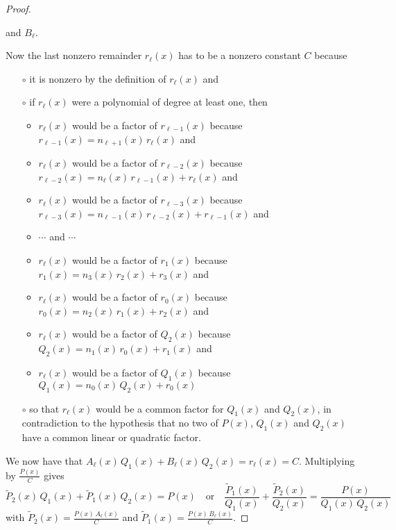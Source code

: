 \begin{proof}
\begin{itemize}
and $B_\ell$. 
\end{itemize}
Now the last nonzero remainder $r_\ell(x)$ has to be a nonzero constant $C$
because
\begin{itemize}\itemsep1pt \parskip0pt  %
\item[$\circ$]
it is nonzero by the definition of $r_\ell(x)$ and
\item[$\circ$]
if $r_\ell(x)$ were a polynomial of degree at least one, then
\begin{itemize}\itemsep1pt \parskip0pt  \itemindent-15pt
\item $r_\ell(x)$ would be a factor of $r_{\ell-1}(x)$ because 
          $r_{\ell-1}(x)=n_{\ell+1}(x)\,r_\ell(x)$ and
\item $r_\ell(x)$ would be a factor of $r_{\ell-2}(x)$ because 
          $r_{\ell-2}(x)=n_\ell(x)\,r_{\ell-1}(x)+r_\ell(x)$ and
\item $r_\ell(x)$ would be a factor of $r_{\ell-3}(x)$ because 
          $r_{\ell-3}(x)=n_{\ell-1}(x)\,r_{\ell-2}(x)+r_{\ell-1}(x)$ and
\item $\cdots$ and $\cdots$
\item $r_\ell(x)$ would be a factor of $r_1(x)$ because 
          $r_1(x)=n_3(x)\,r_2(x)+r_3(x)$ and
\item $r_\ell(x)$ would be a factor of $r_0(x)$ because 
          $r_0(x)=n_2(x)\,r_1(x)+r_2(x)$ and
\item $r_\ell(x)$ would be a factor of $Q_2(x)$ because 
          $Q_2(x)=n_1(x)\,r_0(x)+r_1(x)$ and
\item $r_\ell(x)$ would be a factor of $Q_1(x)$ because 
          $Q_1(x)=n_0(x)\,Q_2(x)+r_0(x)$
\end{itemize}
\item[$\circ$]
so that $r_\ell(x)$ would be a common factor for $Q_1(x)$ and $Q_2(x)$,
in contradiction to the hypothesis that no two of $P(x)$, $Q_1(x)$ and  
$Q_2(x)$  have a common linear or quadratic factor. 
\end{itemize}
We now have that 
         $A_\ell(x)\,Q_1(x)+B_\ell(x)\,Q_2(x)=r_\ell(x)=C$.
Multiplying by $\frac{P(x)}{C}$ gives
\begin{equation*}
\tilde P_2(x)\,Q_1(x)+\tilde P_1(x)\,Q_2(x)=P(x)\quad\text{or}\quad
\frac{\tilde P_1(x)}{Q_1(x)} +\frac{\tilde P_2(x)}{Q_2(x)} 
                                      =\frac{P(x)}{Q_1(x)\,Q_2(x)}
\end{equation*}
with $\tilde P_2(x)=\frac{P(x)\,A_\ell(x)}{C}$ and 
     $\tilde P_1(x)=\frac{P(x)\,B_\ell(x)}{C}$.

\end{proof}

